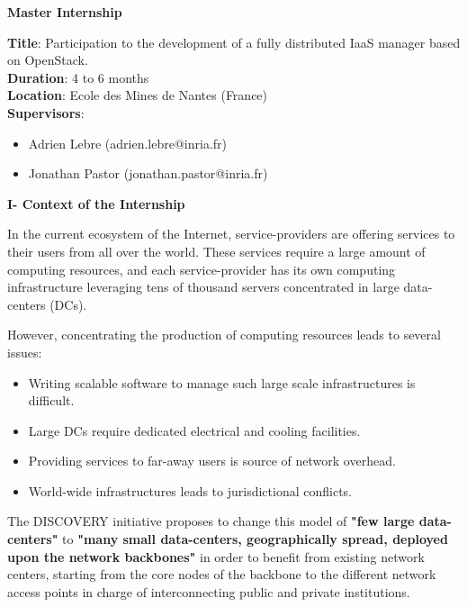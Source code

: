 \documentclass{letter}
\begin{document}
\address{B216 - Ecole des Mines de Nantes\\
4, rue Alfred Kastler, BP 20722\\
44307 Nantes Cedex 3,\\
France}


\begin{letter}
{\Large \textbf{Master Internship}}


\date{01 March 2015}

\opening{}

{\textbf{Title}: Participation to the development of a fully distributed
 IaaS manager based on OpenStack.\\
\textbf{Duration}: 4 to 6 months\\
\textbf{Location}: Ecole des Mines de Nantes (France)\\
\textbf{Supervisors}: \begin{itemize}
\item Adrien Lebre (adrien.lebre@inria.fr)
\item Jonathan Pastor (jonathan.pastor@inria.fr)
\end{itemize}
}

{\Large \textbf{I- Context of the Internship}}

In the current ecosystem of the Internet, service-providers are offering services
to their users from all over the world. These services require
a large amount of computing resources, and each service-provider has its own computing
infrastructure leveraging tens of thousand servers concentrated in large 
data-centers (DCs). 

However, concentrating the production of computing resources leads to several 
issues:

\begin{itemize}
\item  Writing scalable software to manage such large scale infrastructures is
difficult.
\item Large DCs require dedicated electrical and cooling facilities.
\item Providing services to far-away users is source of network overhead.
\item World-wide infrastructures leads to jurisdictional conflicts.
\end{itemize}

The DISCOVERY initiative proposes to change this model of \textbf{"few large 
data-centers"} to \textbf{"many small data-centers, geographically spread, deployed upon 
the network backbones"} in order to benefit from existing network centers, starting from the 
core nodes of the backbone to the different network access points in charge of 
interconnecting public and private institutions. 


\end{letter}
\end{document}
